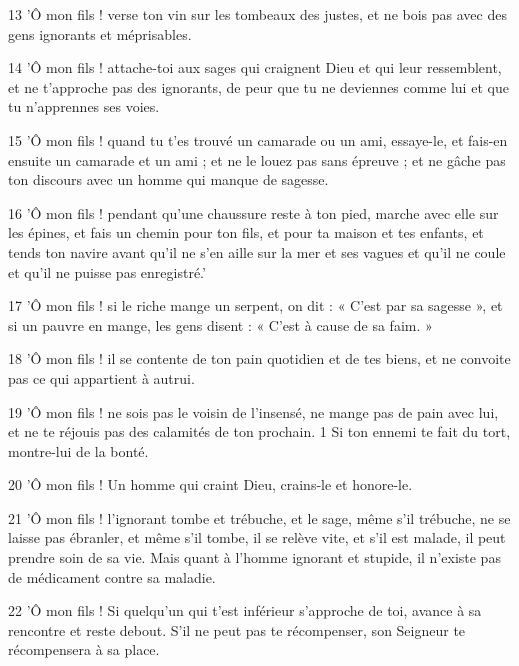 \par 13 'Ô mon fils ! verse ton vin sur les tombeaux des justes, et ne bois pas avec des gens ignorants et méprisables.

\par 14 'Ô mon fils ! attache-toi aux sages qui craignent Dieu et qui leur ressemblent, et ne t'approche pas des ignorants, de peur que tu ne deviennes comme lui et que tu n'apprennes ses voies.

\par 15 'Ô mon fils ! quand tu t'es trouvé un camarade ou un ami, essaye-le, et fais-en ensuite un camarade et un ami ; et ne le louez pas sans épreuve ; et ne gâche pas ton discours avec un homme qui manque de sagesse.

\par 16 'Ô mon fils ! pendant qu'une chaussure reste à ton pied, marche avec elle sur les épines, et fais un chemin pour ton fils, et pour ta maison et tes enfants, et tends ton navire avant qu'il ne s'en aille sur la mer et ses vagues et qu'il ne coule et qu'il ne puisse pas enregistré.'

\par 17 'Ô mon fils ! si le riche mange un serpent, on dit : « C'est par sa sagesse », et si un pauvre en mange, les gens disent : « C'est à cause de sa faim. »

\par 18 'Ô mon fils ! il se contente de ton pain quotidien et de tes biens, et ne convoite pas ce qui appartient à autrui.

\par 19 'Ô mon fils ! ne sois pas le voisin de l'insensé, ne mange pas de pain avec lui, et ne te réjouis pas des calamités de ton prochain. 1 Si ton ennemi te fait du tort, montre-lui de la bonté.

\par 20 'Ô mon fils ! Un homme qui craint Dieu, crains-le et honore-le.

\par 21 'Ô mon fils ! l'ignorant tombe et trébuche, et le sage, même s'il trébuche, ne se laisse pas ébranler, et même s'il tombe, il se relève vite, et s'il est malade, il peut prendre soin de sa vie. Mais quant à l’homme ignorant et stupide, il n’existe pas de médicament contre sa maladie.

\par 22 'Ô mon fils ! Si quelqu'un qui t'est inférieur s'approche de toi, avance à sa rencontre et reste debout. S'il ne peut pas te récompenser, son Seigneur te récompensera à sa place.

